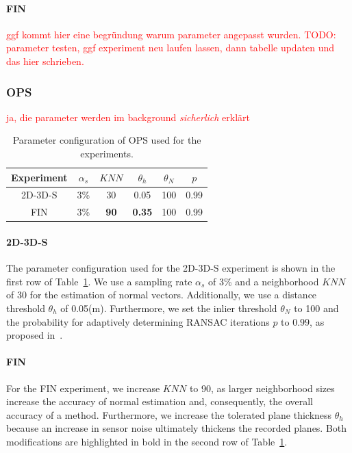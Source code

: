 \documentclass[main.tex]{subfiles}
\begin{document}
\paragraph{FIN}
\textcolor{red}{ggf kommt hier eine begründung warum parameter angepasst wurden. TODO: parameter testen, ggf experiment neu
    laufen lassen, dann tabelle updaten und das hier schrieben.}

\subsubsection{OPS}

\textcolor{red}{ja, die parameter werden im background \textit{sicherlich} erklärt}
\begin{table}[H]
    \centering
    \begin{tabular}{c|ccccc}
        Experiment & $\alpha_s$ & $KNN$       & $\theta_{h}$  & $\theta_{N}$ & $p$  \\ \hline
        2D-3D-S    & 3\%        & 30          & 0.05          & 100          & 0.99 \\
        FIN        & 3\%        & \textbf{90} & \textbf{0.35} & 100          & 0.99
    \end{tabular}%
    \caption{Parameter configuration of OPS used for the experiments.}
    \label{tab:ops-param}
\end{table}

\paragraph{2D-3D-S}
The parameter configuration used for the 2D-3D-S experiment is shown in the first row of Table~\ref{tab:ops-param}.
We use a sampling rate $\alpha_s$ of 3\% and a neighborhood $KNN$ of 30 for the estimation of normal vectors.
Additionally, we use a distance threshold $\theta_h$ of 0.05(m).
Furthermore, we set the inlier threshold $\theta_N$ to 100 and the probability for adaptively determining RANSAC iterations
$p$ to $0.99$, as proposed in~\cite[Section~4A]{Sun_Mordohai_2019}.

\paragraph{FIN}
For the FIN experiment, we increase $KNN$ to 90, as larger neighborhood sizes increase the accuracy of normal estimation and,
consequently, the overall accuracy of a method.
Furthermore, we increase the tolerated plane thickness $\theta_h$ because an increase in sensor noise ultimately thickens the recorded planes.
Both modifications are highlighted in bold in the second row of Table~\ref{tab:ops-param}.
\end{document}
